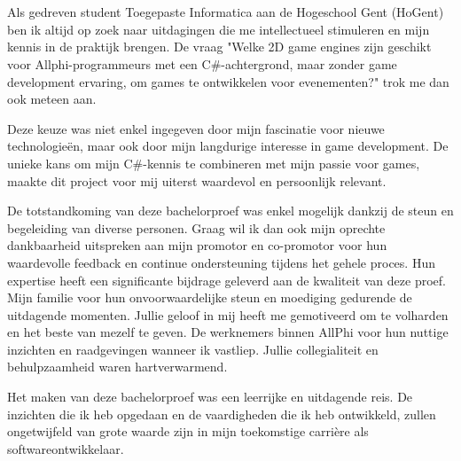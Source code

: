 
\chapter*{}%
\label{ch:voorwoord}


Als gedreven student Toegepaste Informatica aan de Hogeschool Gent (HoGent) ben ik altijd op zoek naar uitdagingen die me intellectueel stimuleren en mijn kennis in de praktijk brengen. De vraag "Welke 2D game engines zijn geschikt voor Allphi-programmeurs met een C#-achtergrond, maar zonder game development ervaring, om games te ontwikkelen voor evenementen?" trok me dan ook meteen aan.

Deze keuze was niet enkel ingegeven door mijn fascinatie voor nieuwe technologieën, maar ook door mijn langdurige interesse in game development. De unieke kans om mijn C#-kennis te combineren met mijn passie voor games, maakte dit project voor mij uiterst waardevol en persoonlijk relevant.

De totstandkoming van deze bachelorproef was enkel mogelijk dankzij de steun en begeleiding van diverse personen. Graag wil ik dan ook mijn oprechte dankbaarheid uitspreken aan mijn promotor en co-promotor voor hun waardevolle feedback en continue ondersteuning tijdens het gehele proces. Hun expertise heeft een significante bijdrage geleverd aan de kwaliteit van deze proef. Mijn familie voor hun onvoorwaardelijke steun en moediging gedurende de uitdagende momenten. Jullie geloof in mij heeft me gemotiveerd om te volharden en het beste van mezelf te geven. De werknemers binnen AllPhi voor hun nuttige inzichten en raadgevingen wanneer ik vastliep. Jullie collegialiteit en behulpzaamheid waren hartverwarmend.

Het maken van deze bachelorproef was een leerrijke en uitdagende reis. De inzichten die ik heb opgedaan en de vaardigheden die ik heb ontwikkeld, zullen ongetwijfeld van grote waarde zijn in mijn toekomstige carrière als softwareontwikkelaar.